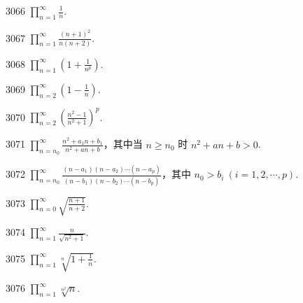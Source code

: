 
\begin{prob}[S]{3066}
$\displaystyle \prod_{n=1}^{\infty} \frac{1}{n}$.
\end{prob}

\begin{prob}[S]{3067}
$\displaystyle \prod_{n=1}^{\infty} \frac{(n+1)^{2}}{n(n+2)}$.
\end{prob}

\begin{prob}[S]{3068}
$\displaystyle \prod_{n=1}^{\infty} \left(1 + \frac{1}{n^{p}}\right)$.
\end{prob}

\begin{prob}[S]{3069}
$\displaystyle \prod_{n=2}^{\infty} \left(1 - \frac{1}{n}\right)$.
\end{prob}

\begin{prob}[S]{3070}
$\displaystyle \prod_{n=2}^{\infty} \left(\frac{n^{2}-1}{n^{2}+1}\right)^{p}$.
\end{prob}

\begin{prob}[M]{3071}
$\displaystyle \prod_{n=n_{0}}^{\infty} \frac{n^{2} + a_{1}n + b_{1}}{n^{2} + an + b}$，其中当 $n \geqslant n_{0}$ 时 $n^{2} + an + b > 0$.
\end{prob}

\begin{prob}[M]{3072}
$\displaystyle \prod_{n=n_{0}}^{\infty} \frac{(n-a_{1})(n-a_{2})\cdots(n-a_{p})}{(n-b_{1})(n-b_{2})\cdots(n-b_{p})}$，其中 $n_{0} > b_{i} \ (i = 1, 2, \cdots, p)$.
\end{prob}

\begin{prob}[S]{3073}
$\displaystyle \prod_{n=0}^{\infty} \sqrt{\frac{n+1}{n+2}}$.
\end{prob}

\begin{prob}[S]{3074}
$\displaystyle \prod_{n=1}^{\infty} \frac{n}{\sqrt{n^{2}+1}}$.
\end{prob}

\begin{prob}[S]{3075}
$\displaystyle \prod_{n=1}^{\infty} \sqrt[n]{1 + \frac{1}{n}}$.
\end{prob}

\begin{prob}[S]{3076}
$\displaystyle \prod_{n=1}^{\infty} \sqrt[n^{2}]{n}$.
\end{prob}

